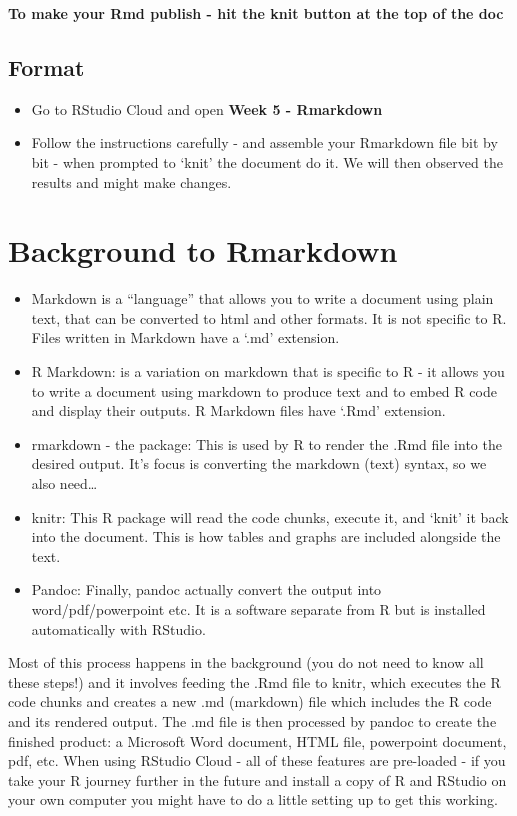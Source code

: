 \documentclass[
]{book}
\begin{document}
\textbf{To make your Rmd publish - hit the knit button at the top of the doc}

\hypertarget{format}{%
\subsection{Format}\label{format}}

\begin{itemize}
\item
  Go to RStudio Cloud and open \textbf{Week 5 - Rmarkdown}
\item
  Follow the instructions carefully - and assemble your Rmarkdown file bit by bit - when prompted to `knit' the document do it. We will then observed the results and might make changes.
\end{itemize}

\hypertarget{background-to-rmarkdown}{%
\section{Background to Rmarkdown}\label{background-to-rmarkdown}}

\begin{itemize}
\item
  Markdown is a ``language'' that allows you to write a document using plain text, that can be converted to html and other formats. It is not specific to R. Files written in Markdown have a `.md' extension.
\item
  R Markdown: is a variation on markdown that is specific to R - it allows you to write a document using markdown to produce text and to embed R code and display their outputs. R Markdown files have `.Rmd' extension.
\item
  rmarkdown - the package: This is used by R to render the .Rmd file into the desired output. It's focus is converting the markdown (text) syntax, so we also need\ldots{}
\item
  knitr: This R package will read the code chunks, execute it, and `knit' it back into the document. This is how tables and graphs are included alongside the text.
\item
  Pandoc: Finally, pandoc actually convert the output into word/pdf/powerpoint etc. It is a software separate from R but is installed automatically with RStudio.
\end{itemize}

Most of this process happens in the background (you do not need to know all these steps!) and it involves feeding the .Rmd file to knitr, which executes the R code chunks and creates a new .md (markdown) file which includes the R code and its rendered output. The .md file is then processed by pandoc to create the finished product: a Microsoft Word document, HTML file, powerpoint document, pdf, etc.
When using RStudio Cloud - all of these features are pre-loaded - if you take your R journey further in the future and install a copy of R and RStudio on your own computer you might have to do a little setting up to get this working.
\end{document}
